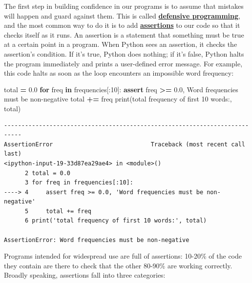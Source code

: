 \documentclass[
]{krantz}
\makeatletter
\newenvironment{Shaded}{\begin{snugshade}}{\end{snugshade}}
\newcommand{\BuiltInTok}[1]{#1}
\newcommand{\ControlFlowTok}[1]{\textcolor[rgb]{0.13,0.29,0.53}{\textbf{#1}}}
\newcommand{\DecValTok}[1]{\textcolor[rgb]{0.00,0.00,0.81}{#1}}
\newcommand{\FloatTok}[1]{\textcolor[rgb]{0.00,0.00,0.81}{#1}}
\newcommand{\KeywordTok}[1]{\textcolor[rgb]{0.13,0.29,0.53}{\textbf{#1}}}
\newcommand{\NormalTok}[1]{#1}
\newcommand{\OperatorTok}[1]{\textcolor[rgb]{0.81,0.36,0.00}{\textbf{#1}}}
\newcommand{\StringTok}[1]{\textcolor[rgb]{0.31,0.60,0.02}{#1}}
\newenvironment{kframe}{%
\medskip{}
\setlength{\fboxsep}{.8em}
 \def\at@end@of@kframe{}%
 \ifinner\ifhmode%
  \def\at@end@of@kframe{\end{minipage}}%
  \begin{minipage}{\columnwidth}%
 \fi\fi%
 \def\FrameCommand##1{\hskip\@totalleftmargin \hskip-\fboxsep
 \colorbox{shadecolor}{##1}\hskip-\fboxsep
     \hskip-\linewidth \hskip-\@totalleftmargin \hskip\columnwidth}%
 \MakeFramed {\advance\hsize-\width
   \@totalleftmargin\z@ \linewidth\hsize
   \@setminipage}}%
 {\par\unskip\endMakeFramed%
 \at@end@of@kframe}
\renewenvironment{Shaded}{\begin{kframe}}{\end{kframe}}
\newcommand{\gref}[2]{\hyperlink{#2}{\textbf{#1}}}
\makeatother
\begin{document}
The first step in building confidence in our programs
is to assume that mistakes will happen and guard against them.
This is called \gref{defensive programming}{defensive\_programming},
and the most common way to do it is to add \gref{assertions}{assertion} to our code
so that it checks itself as it runs.
An assertion is a statement that something must be true at a certain point in a program.
When Python sees an assertion, it checks the assertion's condition.
If it's true, Python does nothing;
if it's false,
Python halts the program immediately and prints a user-defined error message.
For example,
this code halts as soon as the loop encounters an impossible word frequency:

\begin{Shaded}
\begin{Highlighting}[]
\NormalTok{total }\OperatorTok{=} \FloatTok{0.0}
\ControlFlowTok{for}\NormalTok{ freq }\KeywordTok{in}\NormalTok{ frequencies[:}\DecValTok{10}\NormalTok{]:}
    \ControlFlowTok{assert}\NormalTok{ freq }\OperatorTok{\textgreater{}=} \FloatTok{0.0}\NormalTok{, }\StringTok{\textquotesingle{}Word frequencies must be non{-}negative\textquotesingle{}}
\NormalTok{    total }\OperatorTok{+=}\NormalTok{ freq}
\BuiltInTok{print}\NormalTok{(}\StringTok{\textquotesingle{}total frequency of first 10 words:\textquotesingle{}}\NormalTok{, total)}
\end{Highlighting}
\end{Shaded}

\begin{verbatim}
---------------------------------------------------------------------------
AssertionError                            Traceback (most recent call last)
<ipython-input-19-33d87ea29ae4> in <module>()
      2 total = 0.0
      3 for freq in frequencies[:10]:
----> 4     assert freq >= 0.0, 'Word frequencies must be non-negative'
      5     total += freq
      6 print('total frequency of first 10 words:', total)

AssertionError: Word frequencies must be non-negative
\end{verbatim}

Programs intended for widespread use are full of assertions:
10-20\% of the code they contain are there to check that the other 80-90\% are working correctly.
Broadly speaking, assertions fall into three categories:
\end{document}

